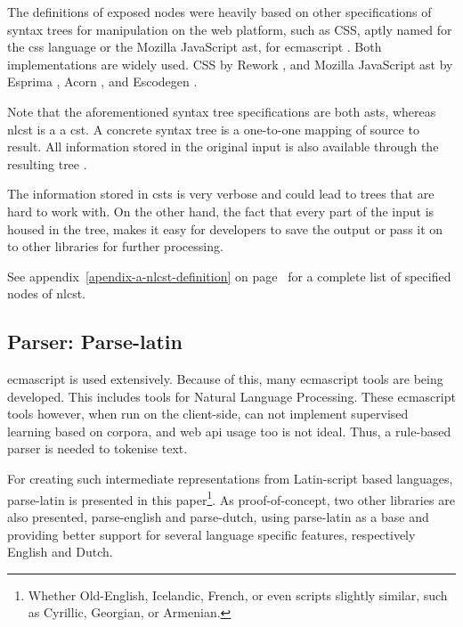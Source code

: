 \begin{enumerate}
The definitions of exposed nodes were heavily based on other
specifications of syntax trees for manipulation on the web platform,
such as CSS, aptly named for the \acrshort{css} language
\autocite{reworkcss/css-source-code} or the Mozilla JavaScript
\acrshort{ast}, for \gls{ecmascript}
\autocite{mozilla.org-spidermonkey-parser_api}. Both implementations are
widely used. CSS by Rework \autocite{reworkcss/rework-source-code}, and
Mozilla JavaScript \gls{ast} by Esprima
\autocite{ariya/esprima-source-code}, Acorn
\autocite{marijnh/acorn-source-code}, and Escodegen
\autocite{constellation/escodegen-source-code}.

Note that the aforementioned syntax tree specifications are both
\glspl{ast}, whereas \gls{nlcst} is a a \gls{cst}. A concrete syntax
tree is a one-to-one mapping of source to result. All information stored
in the original input is also available through the resulting tree
\autocite{thegreenplace.net-abstract-concrete-syntax-trees}.

The information stored in \glspl{cst} is very verbose and could lead to
trees that are hard to work with. On the other hand, the fact that every
part of the input is housed in the tree, makes it easy for developers to
save the output or pass it on to other libraries for further processing.

\medskip \noindent See appendix~\ref{apendix-a-nlcst-definition} on
page~\pageref{apendix-a-nlcst-definition} for a complete list of
specified nodes of \gls{nlcst}.

\subsection{Parser: Parse-latin}\label{parser-parse-latin}

\gls{ecmascript} is used extensively. Because of this, many \gls{ecmascript}
tools are being developed. This includes tools for Natural Language
Processing. These \gls{ecmascript} tools however, when run on the client-side,
can not implement supervised learning based on corpora, and web
\gls{api} usage too is not ideal. Thus, a rule-based parser is needed to
tokenise text.

For creating such intermediate representations from Latin-script based
languages, parse-latin is presented in this paper\footnote{Whether
  Old-English, Icelandic, French, or even scripts slightly similar, such
  as Cyrillic, Georgian, or Armenian.}. As proof-of-concept, two other
libraries are also presented, parse-english and parse-dutch, using
parse-latin as a base and providing better support for several language
specific features, respectively English and Dutch.


\end{enumerate}
